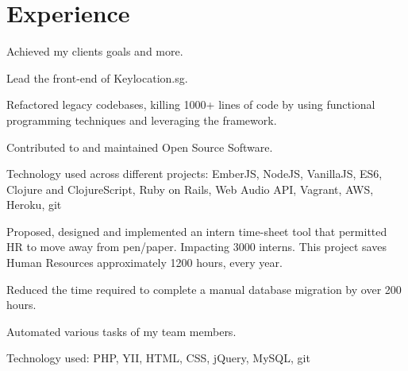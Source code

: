 \documentclass[letterpaper]{deedy-resume} %
\begin{document}
%
%
%
%
%
%
%


\section{Experience}



\vspace{\topsep} %
\begin{tightitemize}
    \item Achieved my clients goals and more.
    \item Lead the front-end of Keylocation.sg.
    \item Refactored legacy codebases, killing 1000+ lines of code by using functional programming techniques and leveraging the framework.
    \item Contributed to and maintained Open Source Software.
    \item Technology used across different projects: EmberJS, NodeJS, VanillaJS, ES6, Clojure and ClojureScript, Ruby on Rails, Web Audio API, Vagrant, AWS, Heroku, git
\end{tightitemize}

\sectionspace %


\begin{tightitemize}
\item Proposed, designed and implemented an intern time-sheet tool that
  permitted HR to move away from pen/paper. Impacting 3000 interns.
  This project saves Human Resources approximately 1200 hours, every year.
\item Reduced the time required to complete a manual database
  migration by over 200 hours.
\item Automated various tasks of my team members.
\item Technology used: PHP, YII, HTML, CSS, jQuery, MySQL, git
\end{tightitemize}
\end{document}
